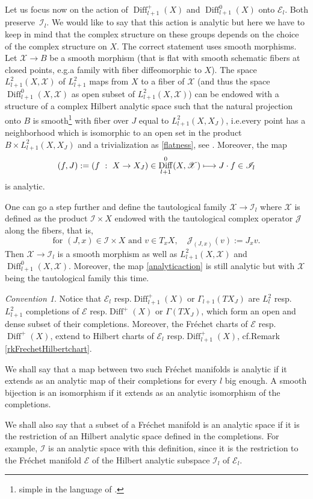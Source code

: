 \documentclass[10pt]{amsart}
\let\mathcal\mathscr
\def\mto{\mathchoice{\longmapsto}{\mapsto}{\mapsto}{\mapsto}}
\DeclareMathOperator{\Diff}{Diff}
\theoremstyle{plain}
\theoremstyle{definition}
\theoremstyle{remark}
\newtheorem{convention}[theorem]{Convention}
\numberwithin{equation}{section}
\newcommand{\cI}{\mathcal{I}}
\providecommand{\eg}{e.g.}\providecommand{\ie}{i.e.}\providecommand{\etc}{etc.}\providecommand{\resp}{resp.}\providecommand{\cf}{cf.}
\begin{document}
Let us focus now on the action of $\Diff^+_{l+1}(X)$ and $\Diff^{0}_{l+1}(X)$ onto $\mathcal E_l$. Both preserve~$\cI_l$. We would like to say that this action is analytic but here we have to keep in mind that the complex structure on these groups depends on the choice of the complex structure on $X$. The correct statement uses smooth morphisms. Let $\mathcal X\to B$ be a smooth morphism (that is flat with smooth schematic fibers at closed points, \eg a family with fiber diffeomorphic to $X$). The space $L^2_{l+1}(X,\mathcal X)$ of $L^2_{l+1}$ maps from $X$ to a fiber of $\mathcal X$ (and thus the space $\Diff^0_{l+1} (X,\mathcal X)$ as open subset of $L^2_{l+1}(X,\mathcal X)$) can be endowed with a structure of a complex Hilbert analytic space such that the natural projection onto $B$ is smooth\footnote{simple in the language of \cite{DouadyBourbaki}.} with fiber over $J$ equal to $L^2_{l+1}(X,X_J)$, \ie every point has a neighborhood which is isomorphic to an open set in the product $B\times L^2_{l+1}(X,X_J)$ and a trivialization as \eqref{flatness}, see \cite{DouadyBourbaki}. Moreover, the map
\begin{equation}
\label{analyticaction}
(f,J):=(f\ :\ X\to X_J)\in\Diff^0_{l+1} (X,\mathcal X)\mto J\cdot f\in \cI_l
\end{equation}
is analytic.

One can go a step further and define the tautological family $\mathcal X\to\cI_l$ where $\mathcal X$ is defined as the product $\cI\times X$ endowed with the tautological complex operator $\mathcal J$ along the fibers, that is,
\begin{equation}
\label{J rond}
\text{for }(J,x)\in \cI\times X\text{ and } v\in T_xX,\quad \mathcal J_{(J,x)}(v):=J_xv.
\end{equation}
Then $\mathcal X\to\cI_l$ is a smooth morphism as well as $L^2_{l+1}(X,\mathcal X)$ and $\Diff^0_{l+1} (X,\mathcal X)$. Moreover, the map \eqref{analyticaction} is still analytic but with $\mathcal X$ being the tautological family this time.

\begin{convention}
\label{ConvFrH}
Notice that $\mathcal E_l$ \resp $\Diff^+_{l+1} (X)$ or $\Gamma_{l+1}(TX_J)$ are $L^2_l$ \resp $L^2_{l+1}$ completions of $\mathcal E$ \resp $\Diff^+ (X)$ or $\Gamma(TX_J)$, which form an open and dense subset of their completions. Moreover, the Fréchet charts of $\mathcal E$ \resp $\Diff^+ (X)$, extend to Hilbert charts of $\mathcal E_l$ \resp $\Diff^+_{l+1} (X)$, \cf Remark \ref{rkFrechetHilbertchart}.

We shall say that a map between two such Fréchet manifolds is analytic if it extends as an analytic map of their completions for every $l$ big enough. A smooth bijection is an isomorphism if it extends as an analytic isomorphism of the completions.

We shall also say that a subset of a Fréchet manifold is an analytic space if it is the restriction of an Hilbert analytic space defined in the completions. For example, $\cI$ is an analytic space with this definition, since it is the restriction to the Fréchet manifold $\mathcal E$ of the Hilbert analytic subspace $\cI_l$ of $\mathcal E_l$.
\end{convention}
\end{document}
